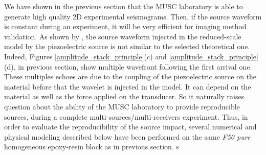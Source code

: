 \documentclass[manuscript,revised]{geophysics}
\begin{document}
\noindent We have shown in the previous section that the MUSC laboratory is able to generate high quality 2D experimental seismograms. Then, if the source waveform is constant during an experiment, it will be very efficient for imaging method validation. As shown by \citet{Bretaudeau_SSM_2011}, the source waveform injected in the reduced-scale model by the piezoelectric source is not similar to the selected theoretical one. Indeed, Figures \ref{amplitude_stack_principle}(c) and \ref{amplitude_stack_principle}(d), in previous section, show multiple wavefront following the first arrival one. These multiples echoes are due to the coupling of the piezoelectric source on the material before that the wavelet is injected in the model. It can depend on the material as well as the force applied on the transducer. So it naturally raises question about the ability of the MUSC laboratory to provide reproducible sources, during a complete multi-sources/multi-receivers experiment. Thus, in order to evaluate the reproducibility of the source impact, several numerical and physical modeling described below have been performed on the same \textit{F50 pure} homogeneous epoxy-resin block as in previous section. s
\end{document}
